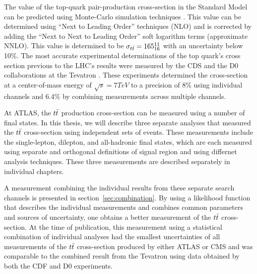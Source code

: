 The value of the top-quark pair-production cross-section in the Standard Model can be predicted using Monte-Carlo simulation techniques \cite{TOP_XSC_THEORY} \cite{TTBAR_HADRON_COLLIDERS} \cite{THRESHOLD_EXPANSION_XSC}.
This value can be determined using ``Next to Leading Order'' techniques (NLO) and is corrected by adding the ``Next to Next to Leading Order'' soft logarithm terms (approximate NNLO).
This value is determined to be $\sigma_{t\bar{t}} = 165^{11}_{16}$ with an uncertainty below 10\%.
The most accurate experimental determinations of the top quark's cross section previous to the LHC's results were measured by the CDS and the D0 collaborations at the Tevatron \cite{TEVATRON_XSC_LJETS} \cite{TEVATRON_XSC_DILEP}.
These experiments determined the cross-section at a center-of-mass energy of $\sqrt{s} = 7 TeV$ to a precision of 8\% using individual channels and 6.4\% by combining measurements across multiple channels.

At ATLAS, the $t\bar{t}$ production cross-section can be measured using a number of final states.
In this thesis, we will describe three separate analyses that measured the $t\bar{t}$ cross-section using independent sets of events.
These measurements include the single-lepton, dilepton, and all-hadronic final states, which are each measured using separate and orthogonal
definitions of signal region and using differnet analysis techniques.
These three measurements are described separately in individual chapters.

A measurement combining the individual results from these separate search channels is presented in section~\ref{sec:combination}.
By using a likelihood function that describes the individual measurements and combines common parameters and sources of uncertainty,
one obtains a better measurement of the $t\bar{t}$ cross-section.
At the time of publication, this measurement using a statistical combination of individual analyses had the smallest uncertainties
of all measurements of the $t\bar{t}$ cross-section produced by either ATLAS or CMS and was comparable to the combined result from 
the Tevatron using data obtained by both the CDF and D0 experiments.


